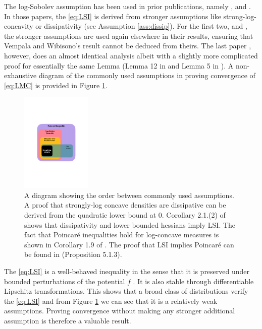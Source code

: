 \documentclass[10pt,journal,a4paper]{IEEEtran}
\theoremstyle{definition}
\begin{document}
The log-Sobolev assumption has been used in prior publications, namely \cite{dalalyan_theoretical_2014},  \cite{raginsky_non-convex_2017} and \cite{ma_sampling_2019}. In those papers, the \eqref{eq:LSI} is derived from stronger assumptions like strong-log-concavity or dissipativity (see Assumption \ref{ass:dissip}). For the first two, \cite{dalalyan_theoretical_2014} and \cite{raginsky_non-convex_2017}, the stronger assumptions are used again elsewhere in their results, ensuring that Vempala and Wibisono's result cannot be deduced from theirs. The last paper \cite{ma_sampling_2019}, however, does an almost identical analysis albeit with a slightly more complicated proof for essentially the same Lemma (Lemma 12 in \cite{vempala_rapid_2019} and Lemma 5 in \cite{ma_sampling_2019}). A non-exhaustive diagram of the commonly used assumptions in proving convergence of \eqref{eq:LMC} is provided in Figure \ref{fig:diagram}.
\begin{figure}
    \centering
    \includegraphics[width=0.3\textwidth]{diagram.pdf}
    \caption{A diagram showing the order between commonly used assumptions.  A proof that strongly-log concave densities are dissipative can be derived from the quadratic lower bound at $0$. Corollary 2.1.(2) of \cite{cattiaux_note_2010} shows that dissipativity and lower bounded hessians imply LSI. The fact that Poincar\'e inequalities  hold for log-concave measures is shown in Corollary 1.9 of \cite{bakry_simple_2008}. The proof that LSI implies Poincar\'e can be found in \cite{bakry_markov_2014}(Proposition 5.1.3).}
    \label{fig:diagram}
\end{figure}

The \eqref{eq:LSI} is a well-behaved inequality in the sense that it is preserved under bounded perturbations of the potential $f$ \cite{ane_sur_2000}. It is also stable through differentiable Lipschitz transformations. This shows that a broad class of distributions verify the \eqref{eq:LSI} and from Figure \ref{fig:diagram} we can see that it is a relatively weak assumptions. Proving convergence without making any stronger additional assumption is therefore a valuable result.
\end{document}

